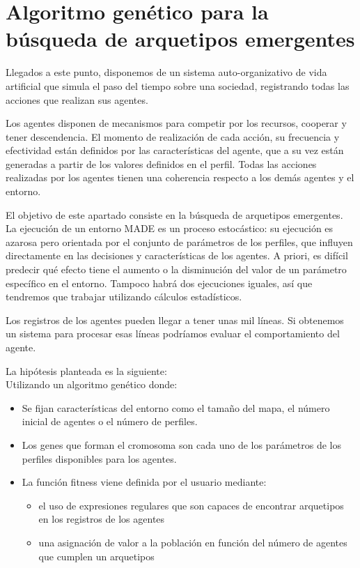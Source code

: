 
\chapter{Algoritmo genético para la búsqueda de arquetipos emergentes}
\label{cha:genetic_algorithm}

Llegados a este punto, disponemos de un sistema auto-organizativo de vida
artificial que simula el paso del tiempo sobre una sociedad, registrando todas
las acciones que realizan sus agentes.

Los agentes disponen de mecanismos para competir por los recursos, cooperar y
tener descendencia. El momento de realización de cada acción, su frecuencia
y efectividad están definidos por las características del agente, que a
su vez están generadas a partir de los valores definidos en el perfil. Todas
las acciones realizadas por los agentes tienen una coherencia respecto a los
demás agentes y el entorno.

El objetivo de este apartado consiste en la búsqueda de arquetipos emergentes.
La ejecución de un entorno MADE es un proceso estocástico: su ejecución es
azarosa pero orientada por el conjunto de parámetros de los perfiles,
que influyen directamente en las decisiones y características de los agentes. A
priori, es difícil predecir qué efecto tiene el aumento o la disminución del
valor de un parámetro específico en el entorno. Tampoco habrá dos 
ejecuciones iguales, así que tendremos que trabajar utilizando cálculos
estadísticos.

Los registros de los agentes pueden llegar a tener unas mil líneas. Si
obtenemos un sistema para procesar esas líneas podríamos evaluar el
comportamiento del agente.

La hipótesis planteada es la siguiente:\\



Utilizando un algoritmo genético donde:

\begin{itemize}
\item Se fijan características del entorno como el tamaño del mapa, el número
inicial de agentes o el número de perfiles.
\item Los genes que forman el cromosoma son cada uno de los parámetros de los
perfiles disponibles para los agentes.
\item La función fitness viene definida por el usuario mediante:
  \begin{itemize}
   \item el uso de expresiones regulares que son capaces de encontrar arquetipos
en los registros de los agentes
   \item una asignación de valor a la población en función del
número de agentes que cumplen un arquetipos
  \end{itemize}
\end{itemize}

